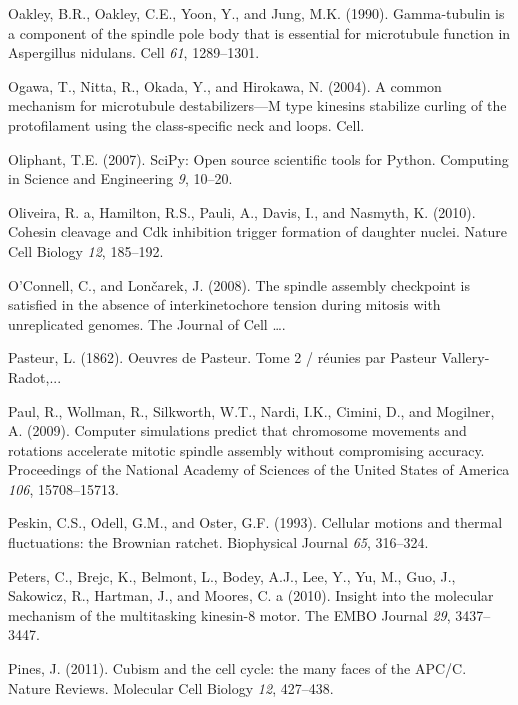 \documentclass[12pt,a4paper,twoside,openright]{book}
\begin{document}
\hypertarget{ref-Oakley1990}{}
Oakley, B.R., Oakley, C.E., Yoon, Y., and Jung, M.K. (1990).
Gamma-tubulin is a component of the spindle pole body that is essential
for microtubule function in Aspergillus nidulans. Cell \emph{61},
1289--1301.

\hypertarget{ref-Ogawa2004}{}
Ogawa, T., Nitta, R., Okada, Y., and Hirokawa, N. (2004). A common
mechanism for microtubule destabilizers---M type kinesins stabilize
curling of the protofilament using the class-specific neck and loops.
Cell.

\hypertarget{ref-Oliphant2007}{}
Oliphant, T.E. (2007). SciPy: Open source scientific tools for Python.
Computing in Science and Engineering \emph{9}, 10--20.

\hypertarget{ref-Oliveira2010}{}
Oliveira, R. a, Hamilton, R.S., Pauli, A., Davis, I., and Nasmyth, K.
(2010). Cohesin cleavage and Cdk inhibition trigger formation of
daughter nuclei. Nature Cell Biology \emph{12}, 185--192.

\hypertarget{ref-OConnell2008}{}
O'Connell, C., and Lončarek, J. (2008). The spindle assembly checkpoint
is satisfied in the absence of interkinetochore tension during mitosis
with unreplicated genomes. The Journal of Cell \ldots{}.

\hypertarget{ref-Pasteur}{}
Pasteur, L. (1862). Oeuvres de Pasteur. Tome 2 / réunies par Pasteur
Vallery-Radot,...

\hypertarget{ref-Paul2009}{}
Paul, R., Wollman, R., Silkworth, W.T., Nardi, I.K., Cimini, D., and
Mogilner, A. (2009). Computer simulations predict that chromosome
movements and rotations accelerate mitotic spindle assembly without
compromising accuracy. Proceedings of the National Academy of Sciences
of the United States of America \emph{106}, 15708--15713.

\hypertarget{ref-Peskin1993}{}
Peskin, C.S., Odell, G.M., and Oster, G.F. (1993). Cellular motions and
thermal fluctuations: the Brownian ratchet. Biophysical Journal
\emph{65}, 316--324.

\hypertarget{ref-Peters2010}{}
Peters, C., Brejc, K., Belmont, L., Bodey, A.J., Lee, Y., Yu, M., Guo,
J., Sakowicz, R., Hartman, J., and Moores, C. a (2010). Insight into the
molecular mechanism of the multitasking kinesin-8 motor. The EMBO
Journal \emph{29}, 3437--3447.

\hypertarget{ref-Pines2011}{}
Pines, J. (2011). Cubism and the cell cycle: the many faces of the
APC/C. Nature Reviews. Molecular Cell Biology \emph{12}, 427--438.
\end{document}
